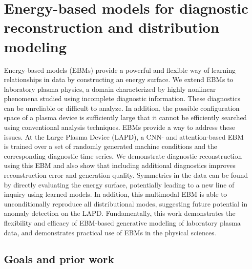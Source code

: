 \graphicspath{{Chapters/Chapter_ebm/}}

\chapter{Energy-based models for diagnostic reconstruction and distribution modeling}
\label{ch:ebm}

 Energy-based models (EBMs) provide a powerful and flexible way of learning relationships in data by constructing an energy surface. We extend EBMs to laboratory plasma physics, a domain characterized by highly nonlinear phenomena studied using incomplete diagnostic information. These diagnostics can be unreliable or difficult to analyze. In addition, the possible configuration space of a plasma device is sufficiently large that it cannot be efficiently searched using conventional analysis techniques. EBMs provide a way to address these issues. At the Large Plasma Device (LAPD), a CNN- and attention-based EBM is trained over a set of randomly generated machine conditions and the corresponding diagnostic time series. We demonstrate diagnostic reconstruction using this EBM and also show that including additional diagnostics improves reconstruction error and generation quality.
  Symmetries in the data can be found by directly evaluating the energy surface, potentially leading to a new line of inquiry using learned models. In addition, this multimodal EBM is able to unconditionally reproduce all distributional modes, suggesting future potential in anomaly detection on the LAPD. Fundamentally, this work demonstrates the flexibility and efficacy of EBM-based generative modeling of laboratory plasma data, and demonstrates practical use of EBMs in the physical sciences.



\section{Goals and prior work}

